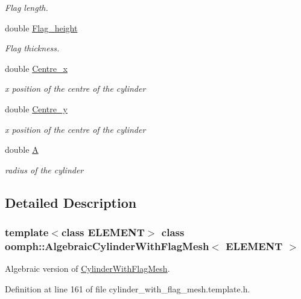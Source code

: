 \begin{DoxyCompactItemize}
\begin{DoxyCompactList}\small\item\em Flag length. \end{DoxyCompactList}\item 
double \hyperlink{classoomph_1_1AlgebraicCylinderWithFlagMesh_a76a19a39dd500d5a48c10baae59797e0}{Flag\+\_\+height}
\begin{DoxyCompactList}\small\item\em Flag thickness. \end{DoxyCompactList}\item 
double \hyperlink{classoomph_1_1AlgebraicCylinderWithFlagMesh_a3290ac9103e43f4a4a997fe4692b6506}{Centre\+\_\+x}
\begin{DoxyCompactList}\small\item\em x position of the centre of the cylinder \end{DoxyCompactList}\item 
double \hyperlink{classoomph_1_1AlgebraicCylinderWithFlagMesh_a6b4575a9c3818e04bdb00d4150d49290}{Centre\+\_\+y}
\begin{DoxyCompactList}\small\item\em x position of the centre of the cylinder \end{DoxyCompactList}\item 
double \hyperlink{classoomph_1_1AlgebraicCylinderWithFlagMesh_aabc6cdfe508f04a4b1c92f2c2f1639c4}{A}
\begin{DoxyCompactList}\small\item\em radius of the cylinder \end{DoxyCompactList}\end{DoxyCompactItemize}


\subsection{Detailed Description}
\subsubsection*{template$<$class E\+L\+E\+M\+E\+NT$>$\newline
class oomph\+::\+Algebraic\+Cylinder\+With\+Flag\+Mesh$<$ E\+L\+E\+M\+E\+N\+T $>$}

Algebraic version of \hyperlink{classoomph_1_1CylinderWithFlagMesh}{Cylinder\+With\+Flag\+Mesh}. 

Definition at line 161 of file cylinder\+\_\+with\+\_\+flag\+\_\+mesh.\+template.\+h.



